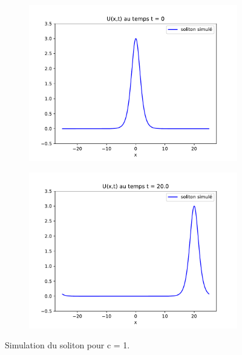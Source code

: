 \documentclass[12pt,a4paper]{article}
\numberwithin{equation}{section}
\begin{document}
\begin{figure}[H]
\centering
\begin{subfigure}
  \centering
  \includegraphics[width=0.45\linewidth]{graphs/Soliton_t0.pdf}
  \label{fig:sub1}
\end{subfigure}%
\begin{subfigure}
  \centering
  \includegraphics[width=0.45\linewidth]{graphs/Soliton_t1.pdf}
  \label{fig:sub2}
\end{subfigure}
\caption{Simulation du soliton pour c = 1.} 
\end{figure}


\newpage
\nocite{MT}
\nocite{Lannes}
\printbibliography
\end{document}
